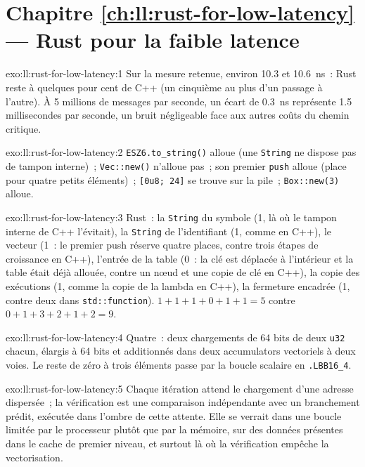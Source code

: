 \section*{Chapitre \ref{ch:ll:rust-for-low-latency} --- Rust pour la faible latence}

\begin{solution}{exo:ll:rust-for-low-latency:1}
Sur la mesure retenue, environ 10.3 et \qty{10.6}{\nano\second}~: Rust reste à quelques pour cent de C++ (un cinquième au plus
d'un passage à l'autre). À 5 millions de messages par seconde, un écart de \qty{0.3}{\nano\second} représente 1.5 millisecondes par
seconde, un bruit négligeable face aux autres coûts du chemin critique.
\end{solution}

\begin{solution}{exo:ll:rust-for-low-latency:2}
\texttt{\textquotedbl{}ESZ6\textquotedbl{}.to\_string()} alloue (une \texttt{String} ne dispose pas de tampon interne)~; \texttt{Vec::new()} n'alloue pas~; son premier
\texttt{push} alloue (place pour quatre petits éléments)~; \texttt{[0u8; 24]} se trouve sur la pile~; \texttt{Box::new(3)} alloue.
\end{solution}

\begin{solution}{exo:ll:rust-for-low-latency:3}
Rust~: la \texttt{String} du symbole (1, là où le tampon interne de C++ l'évitait), la \texttt{String} de l'identifiant (1, comme en
C++), le vecteur (1~: le premier push réserve quatre places, contre trois étapes de croissance en C++), l'entrée de la table
(0~: la clé est déplacée à l'intérieur et la table était déjà allouée, contre un nœud et une copie de clé en C++), la copie des
exécutions (1, comme la copie de la lambda en C++), la fermeture encadrée (1, contre deux dans \texttt{std::function}). $1+1+1+0+1+1 = 5$ contre $0+1+3+2+1+2 = 9$.
\end{solution}

\begin{solution}{exo:ll:rust-for-low-latency:4}
Quatre~: deux chargements de 64 bits de deux \texttt{u32} chacun, élargis à 64 bits et additionnés dans deux accumulators vectoriels à deux voies.
Le reste de zéro à trois éléments passe par la boucle scalaire en \texttt{.LBB16\_4}.
\end{solution}

\begin{solution}{exo:ll:rust-for-low-latency:5}
Chaque itération attend le chargement d'une adresse dispersée~; la vérification est une comparaison indépendante avec un branchement prédit,
exécutée dans l'ombre de cette attente. Elle se verrait dans une boucle limitée par le processeur plutôt que par la mémoire, sur des données présentes dans le
cache de premier niveau, et surtout là où la vérification empêche la vectorisation.
\end{solution}

